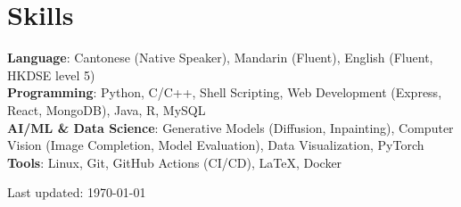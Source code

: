 \documentclass[a4paper,11pt]{article}
\begin{document}
\section{Skills}
  \begin{itemize}[leftmargin=0.15in, label={}]
    \small{\item{
      \textbf{Language}{: Cantonese (Native Speaker), Mandarin (Fluent), English (Fluent, HKDSE level 5)} \\[2pt]
      \textbf{Programming}{: Python, C/C++, Shell Scripting, Web Development (Express, React, MongoDB), Java, R, MySQL} \\[2pt]
      \textbf{AI/ML \& Data Science}{: Generative Models (Diffusion, Inpainting), Computer Vision (Image Completion, Model Evaluation), Data Visualization, PyTorch} \\[2pt]
      \textbf{Tools}{: Linux, Git, GitHub Actions (CI/CD), LaTeX, Docker}
    }}
  \end{itemize}

\vfill
\begin{center}
\footnotesize
Last updated: \today
\end{center}
\end{document}
